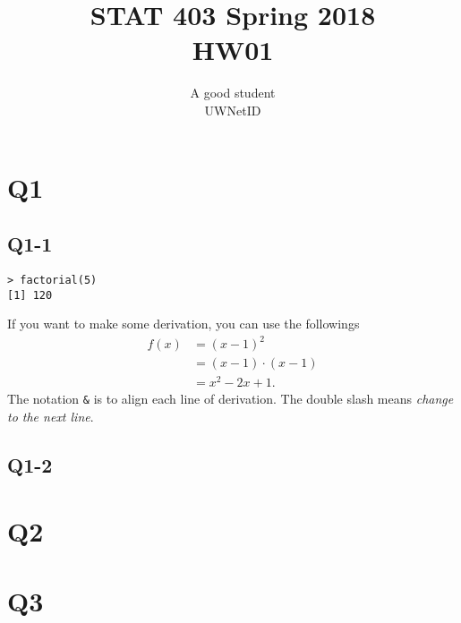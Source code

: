 \documentclass[12pt,letterpaper]{article}
\author{A good student\\UWNetID}
\title{STAT 403 Spring 2018\\HW01}
\begin{document}
\maketitle

\section{Q1}


\subsection{Q1-1}
\begin{verbatim}
> factorial(5)
[1] 120
\end{verbatim}




If you want to make some derivation,
you can use the followings
\begin{align*}
f(x) & = (x-1)^2\\
&= (x-1)\cdot (x-1)\\
&= x^2 -2x +1.
\end{align*}
The notation {\tt \&} is to align each line of derivation.
The double slash means \emph{change to the next line}. 




\subsection{Q1-2}



\section{Q2}


\section{Q3}




\end{document}
